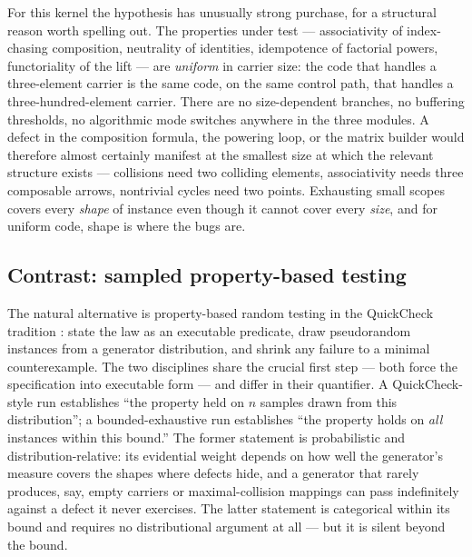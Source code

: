 For this kernel the hypothesis has unusually strong purchase, for a
structural reason worth spelling out. The properties under test ---
associativity of index-chasing composition, neutrality of identities,
idempotence of factorial powers, functoriality of the lift --- are
\emph{uniform} in carrier size: the code that handles a three-element
carrier is the same code, on the same control path, that handles a
three-hundred-element carrier. There are no size-dependent branches, no
buffering thresholds, no algorithmic mode switches anywhere in the three
modules. A defect in the composition formula, the powering loop, or the
matrix builder would therefore almost certainly manifest at the smallest
size at which the relevant structure exists --- collisions need two
colliding elements, associativity needs three composable arrows,
nontrivial cycles need two points. Exhausting small scopes covers every
\emph{shape} of instance even though it cannot cover every \emph{size},
and for uniform code, shape is where the bugs are.

\subsection{Contrast: sampled property-based testing}

The natural alternative is property-based random testing in the QuickCheck
tradition \cite{quickcheck}: state the law as an executable predicate,
draw pseudorandom instances from a generator distribution, and shrink any
failure to a minimal counterexample. The two disciplines share the crucial
first step --- both force the specification into executable form --- and
differ in their quantifier. A QuickCheck-style run establishes ``the
property held on $n$ samples drawn from this distribution''; a
bounded-exhaustive run establishes ``the property holds on \emph{all}
instances within this bound.'' The former statement is probabilistic and
distribution-relative: its evidential weight depends on how well the
generator's measure covers the shapes where defects hide, and a generator
that rarely produces, say, empty carriers or maximal-collision mappings
can pass indefinitely against a defect it never exercises. The latter
statement is categorical within its bound and requires no distributional
argument at all --- but it is silent beyond the bound.

